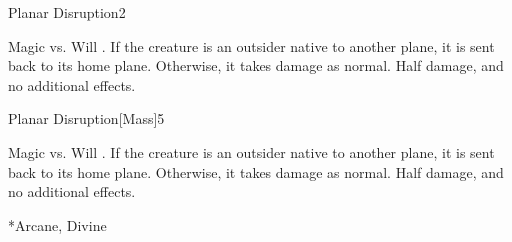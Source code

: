 \begin{spellsection}{Planar Disruption}{2}
    \begin{spellheader}
    \end{spellheader}
    \begin{spellcontent}
        \begin{spelltargetinginfo}
        \end{spelltargetinginfo}
        \begin{spelleffects}
            \begin{spellattack}{Magic vs. Will}
                \spellsuccess {}.
                \spellcritical If the creature is an outsider native to another plane, it is sent back to its home plane. Otherwise, it takes damage as normal.
                \spellfailure Half damage, and no additional effects.
            \end{spellattack}
        \end{spelleffects}
    \end{spellcontent}
    \begin{spellfooter}
        \miscastrandom
    \end{spellfooter}
\end{spellsection}

\begin{spellsection}{Planar Disruption}[Mass]{5}
    \begin{spellheader}
    \end{spellheader}
    \begin{spellcontent}
        \begin{spelltargetinginfo}
        \end{spelltargetinginfo}
        \begin{spelleffects}
            \begin{spellattack}{Magic vs. Will}
                \spellsuccess {}.
                \spellcritical If the creature is an outsider native to another plane, it is sent back to its home plane. Otherwise, it takes damage as normal.
                \spellfailure Half damage, and no additional effects.
            \end{spellattack}
        \end{spelleffects}
    \end{spellcontent}
    \begin{spellfooter}
        *{Arcane, Divine}
        \miscastexplode
    \end{spellfooter}
\end{spellsection}

